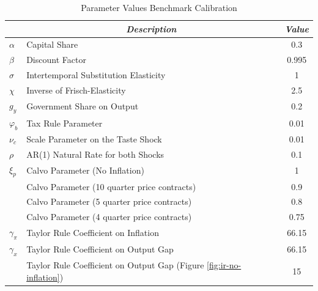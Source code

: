 \newpage

\begin{table}[th]
\centering
\caption{Parameter Values Benchmark Calibration}
\bigskip
\bgroup
\def\arraystretch{1.5}
\begin{tabular}{p{1.2cm} l c}
\toprule\toprule \noalign{\smallskip}
 & \multicolumn{1}{c}{\textit{Description}} & \textit{Value} \\
\hline\noalign{\smallskip}

$\alpha$ & Capital Share   & 0.3 \\
$\beta$  & Discount Factor & 0.995 \\
$\sigma$ & Intertemporal Substitution Elasticity & 1 \\
$\chi$ & Inverse of Frisch-Elasticity & 2.5 \\
$g_y$ & Government Share on Output & 0.2 \\
$\varphi_b$ & Tax Rule Parameter & 0.01 \\
$\nu_c$ & Scale Parameter on the Taste Shock & 0.01 \\
$\rho$ & AR(1) Natural Rate for both Shocks & 0.1 \\
$\xi_p$ & Calvo Parameter (No Inflation) & 1 \\
 & Calvo Parameter (10 quarter price contracts) & 0.9 \\
 & Calvo Parameter (5  quarter price contracts) & 0.8 \\
 & Calvo Parameter (4  quarter price contracts) & 0.75 \\
$\gamma_{\pi}$ & Taylor Rule Coefficient on Inflation & 66.15 \\
$\gamma_x$ & Taylor Rule Coefficient on Output Gap & 66.15 \\
 & Taylor Rule Coefficient on Output Gap (Figure \ref{fig:ir-no-inflation}) & 15 \\
\bottomrule
\end{tabular}
\egroup
\label{tab:benchmark-parameters}
\end{table}

